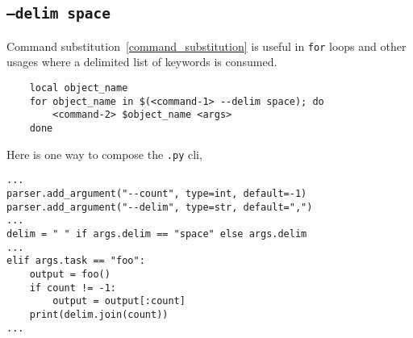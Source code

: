 \subsection{\texttt{--delim space}}
\label{delim}

Command substitution~\ref{command_substitution} is useful in \texttt{for} loops and other usages where a delimited list of keywords is consumed.
%
\begin{verbatim}
    local object_name
    for object_name in $(<command-1> --delim space); do
        <command-2> $object_name <args>
    done
\end{verbatim}
%
Here is one way to compose the \texttt{.py} cli,
%
\begin{verbatim}
...
parser.add_argument("--count", type=int, default=-1)
parser.add_argument("--delim", type=str, default=",")
...
delim = " " if args.delim == "space" else args.delim
...
elif args.task == "foo":
    output = foo()
    if count != -1:
        output = output[:count]
    print(delim.join(count))
...
\end{verbatim}